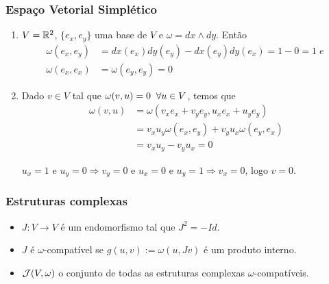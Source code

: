 \documentclass{beamer}
\begin{document}
\begin{footnotesize}
	
	\begin{frame}
		\frametitle{Espaço Vetorial Simplético}
	\begin{exemplo}
			\begin{enumerate}
				\item $V = \mathbb{R}^{2}$, $\{e_{x}, e_{y}\}$ uma base de $V$ e $\omega=dx \wedge dy$. Então 
				$$
				\begin{aligned}
					\omega(e_{x}, e_{y}) &=dx(e_{x}) dy(e_{y}) - dx(e_{y}) dy(e_{x}) = 1-0= 1 \; e\; 
					\\
					\omega(e_{x}, e_{x}) &= \omega(e_{y}, e_{y}) = 0	
				\end{aligned}
				$$ 
				
				\item Dado $v \in V$ tal que $\omega(v, u)=0 \;\;\forall u \in V$, temos que 
				$$
				\begin{aligned}
					\omega(v, u) &= \omega(v_{x}e_{x}+v_{y}e_{y}, u_{x}e_{x}+u_{y}e_{y})
					\\
					&=
					v_{x}u_{y}\omega(e_{x}, e_{y}) +v_{y}u_{x}\omega(e_{y}, e_{x})
					\\
					&= v_{x}u_{y} -v_{y}u_{x} = 0
				\end{aligned}
				$$
				
				$u_{x} = 1$ e $u_{y} = 0 \Rightarrow v_{y} = 0$ e $u_{x} = 0$ e $u_{y} = 1 \Rightarrow v_{x} = 0$, logo $v=0$.
				
			\end{enumerate}			
		\end{exemplo}
	\end{frame}
	
	\begin{frame}
		\frametitle{Estruturas complexas}
		
		\begin{definicao}
			\begin{itemize}
				\item $J: V \to V$ é um endomorfismo tal que $J^{2} = -Id$. 
				
				\item $J$ é $\omega$-compatível se $g(u,v):=\omega(u, Jv)$ é um produto interno. 
				
				\item $\mathcal{J}(V, \omega)$ o conjunto de todas as estruturas complexas $\omega$-compatíveis.
				

\end{itemize}
\end{definicao}
\end{frame}
\end{footnotesize}
\end{document}
